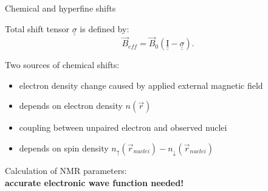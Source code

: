 \documentclass[slovene, usenames,dvipsnames]{beamer}
\begin{document}
\begin{frame}{Chemical and hyperfine shifts}

         \begin{definition}
 Total shift tensor $\underline{\underline{\sigma}}$ is defined by:
        \vspace*{-0.5\baselineskip}
        \centering
    \begin{equation} \nonumber
      \vec{B}_{eff}=\vec{B}_0\left( \underline{\underline{ \mathrm I }} - \underline{\underline{ \sigma}} \right).
    \end{equation}
  \end{definition}

  \centering Two sources of chemical shifts:
  
  \begin{minipage}[t]{0.5\textwidth}
    \begin{itemize}
     \item electron density change caused by applied external magnetic field
     \item depends on electron density $n(\vec r)$
      \end{itemize}
  \end{minipage}%
  \begin{minipage}[t]{0.5\textwidth}
    \begin{itemize}
      \item coupling between unpaired electron and observed nuclei
     \item depends on spin density $n_{\uparrow}(\vec r_{nuclei}) - n_{\downarrow}(\vec r_{nuclei})$
      \end{itemize}
    \end{minipage}
    Calculation of NMR parameters:\\\bf{accurate electronic wave function needed!}
  \end{frame}

  
\end{document}
